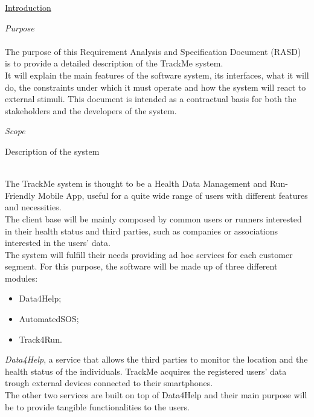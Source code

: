 \documentclass{article}
\begin{document}
\newpage
	\begin{legal}\bfseries
 	\item \underline{Introduction} 
  		\begin{legal}
    		\item \textit{Purpose}\\
		\\
		{\normalfont
		The purpose of this Requirement Analysis and Specification Document (RASD) is to provide a detailed description of the TrackMe system.\\ 
		It will explain the main features of the software system, its interfaces, what it will do, the constraints under which it must operate and how the system will react to external stimuli. This document is intended as a contractual basis for both the stakeholders and the developers of the system.
		}\\
		\item \textit{Scope}\\
			\begin{legal}
    		\item Description of the system \\\\
			{\normalfont
The TrackMe system is thought to be a Health Data Management and Run-Friendly Mobile App, useful for a quite wide range of users with different features and necessities.\\ The client base will be mainly composed by common users or runners interested in their health status and third parties, such as companies or associations interested in the users' data.\\ The system will fulfill their needs providing ad hoc services for each customer segment. For this purpose, the software will be made up of three different modules:\\
		\begin{itemize}
		\item Data4Help;\\
		\item AutomatedSOS;\\
		\item Track4Run.\\
		\end{itemize}
\textit {Data4Help}, a service that allows the third parties to monitor the location and the health status of the individuals. TrackMe acquires the registered users' data trough external devices connected to their smartphones.\\
The other two services are built on top of Data4Help and their main purpose will be to provide tangible functionalities to the users.\\
}
\end{legal}
\end{legal}
\end{legal}
\end{document}
